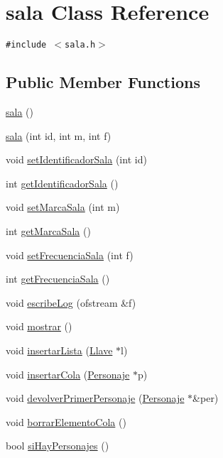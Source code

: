\hypertarget{classsala}{
\section{sala Class Reference}
\label{classsala}
}
{\tt \#include $<$sala.h$>$}

\subsection*{Public Member Functions}
\begin{CompactItemize}
\item 
\hyperlink{classsala_780a8c359e96eaf55403409c019d536a}{sala} ()
\item 
\hyperlink{classsala_265933f2f255cbce1f724d1c07957d69}{sala} (int id, int m, int f)
\item 
void \hyperlink{classsala_6e2f990c9e2b6fe2c08ba3853e5299c4}{setIdentificadorSala} (int id)
\item 
int \hyperlink{classsala_d6eb9a00920ec3f7eee7134d478ddf76}{getIdentificadorSala} ()
\item 
void \hyperlink{classsala_74d517148cdcaf0aa1a58bc877f9c910}{setMarcaSala} (int m)
\item 
int \hyperlink{classsala_099a7d79e8142f14dacfcc869f5557c3}{getMarcaSala} ()
\item 
void \hyperlink{classsala_ae7603393ce64c66c0d954e7ba452260}{setFrecuenciaSala} (int f)
\item 
int \hyperlink{classsala_24c1c2cf672362b9e82d0584cd63af97}{getFrecuenciaSala} ()
\item 
void \hyperlink{classsala_68552d6940a68c2a4cd4351f38acf546}{escribeLog} (ofstream \&f)
\item 
void \hyperlink{classsala_468ec985fcba82e578dd81de0102dede}{mostrar} ()
\item 
void \hyperlink{classsala_43d8051f7213fd82d30b5b7b56043877}{insertarLista} (\hyperlink{classLlave}{Llave} $\ast$l)
\item 
void \hyperlink{classsala_83833f513f3f53033e6e8fc3cacded73}{insertarCola} (\hyperlink{classPersonaje}{Personaje} $\ast$p)
\item 
void \hyperlink{classsala_306fe8573f4ed40792d59a7f9e580b30}{devolverPrimerPersonaje} (\hyperlink{classPersonaje}{Personaje} $\ast$\&per)
\item 
void \hyperlink{classsala_6bf07428f9bca5ff621845ac18b34ee4}{borrarElementoCola} ()
\item 
bool \hyperlink{classsala_0b13578fe6d2a10d6102920dfc9216b0}{siHayPersonajes} ()

\end{CompactItemize}
